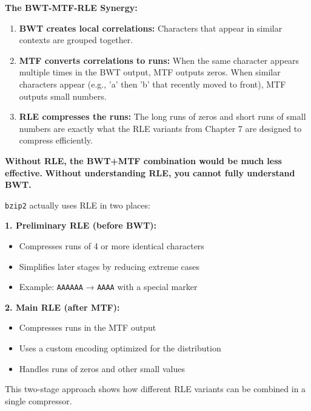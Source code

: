 \begin{importantbox}
\textbf{The BWT-MTF-RLE Synergy:}

\begin{enumerate}
    \item \textbf{BWT creates local correlations:} Characters that appear in similar contexts are grouped together.
    
    \item \textbf{MTF converts correlations to runs:} When the same character appears multiple times in the BWT output, MTF outputs zeros. When similar characters appear (e.g., 'a' then 'b' that recently moved to front), MTF outputs small numbers.
    
    \item \textbf{RLE compresses the runs:} The long runs of zeros and short runs of small numbers are exactly what the RLE variants from Chapter 7 are designed to compress efficiently.
\end{enumerate}

\textbf{Without RLE, the BWT+MTF combination would be much less effective.}
\textbf{Without understanding RLE, you cannot fully understand BWT.}
\end{importantbox}

\begin{examplebox}

\texttt{bzip2} actually uses RLE in two places:

\textbf{1. Preliminary RLE (before BWT):}
\begin{itemize}
    \item Compresses runs of 4 or more identical characters
    \item Simplifies later stages by reducing extreme cases
    \item Example: \texttt{AAAAAA} → \texttt{AAAA} with a special marker
\end{itemize}

\textbf{2. Main RLE (after MTF):}
\begin{itemize}
    \item Compresses runs in the MTF output
    \item Uses a custom encoding optimized for the distribution
    \item Handles runs of zeros and other small values
\end{itemize}

This two-stage approach shows how different RLE variants can be combined in a single compressor.
\end{examplebox}

